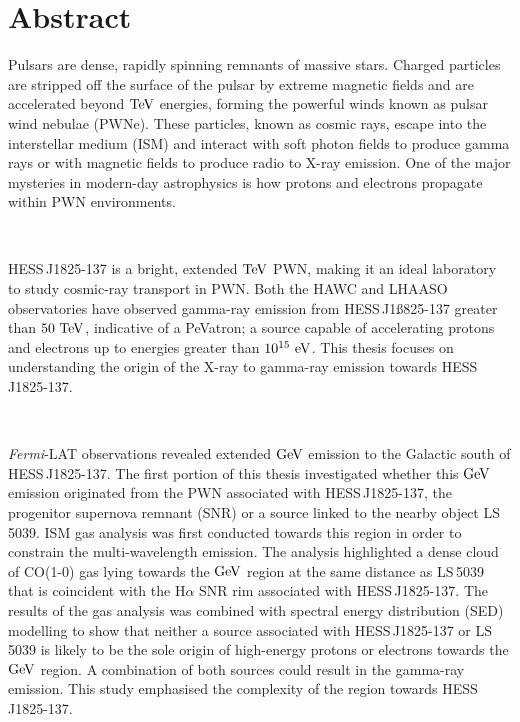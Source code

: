 \chapter{Abstract}
Pulsars are dense, rapidly spinning remnants of massive stars. Charged particles are stripped off the surface of the pulsar by extreme magnetic fields and are accelerated beyond $\TeV$ energies, forming the powerful winds known as pulsar wind nebulae (PWNe). These particles, known as cosmic rays, escape into the interstellar medium (ISM) and interact with soft photon fields to produce gamma rays or with magnetic fields to produce radio to X-ray emission. One of the major mysteries in modern-day astrophysics is how protons and electrons propagate within PWN environments.
\par~\par
\mbox{HESS\,J1825-137} is a bright, extended $\TeV$ PWN, making it an ideal laboratory to study cosmic-ray transport in PWN. Both the HAWC and LHAASO observatories have observed gamma-ray emission from \mbox{HESS\,J1ß825-137} greater than $50~\TeV$, indicative of a PeVatron; a source capable of accelerating protons and electrons up to energies greater than $10^{15}~\si{\electronvolt}$. This thesis focuses on understanding the origin of the X-ray to gamma-ray emission towards \mbox{HESS\,J1825-137}.
\par~\par
\textit{Fermi}-LAT observations revealed extended $\si{\giga\electronvolt}$ emission to the Galactic south of \mbox{HESS\,J1825-137}. The first portion of this thesis investigated whether this $\si{\giga\electronvolt}$ emission originated from the PWN associated with \mbox{HESS\,J1825-137}, the progenitor supernova remnant (SNR) or a source linked to the nearby object \mbox{LS\,5039}. ISM gas analysis was first conducted towards this region in order to constrain the multi-wavelength emission. The analysis highlighted a dense cloud of CO(1-0) gas lying towards the $\si{\giga\electronvolt}$ region at the same distance as \mbox{LS\,5039} that is coincident with the H$\alpha$ SNR rim associated with \mbox{HESS\,J1825-137}. The results of the gas analysis was combined with spectral energy distribution (SED) modelling to show that neither a source associated with \mbox{HESS\,J1825-137} or \mbox{LS\,5039} is likely to be the sole origin of high-energy protons or electrons towards the $\si{\giga\electronvolt}$ region. A combination of both sources could result in the gamma-ray emission. This study emphasised the complexity of the region towards \mbox{HESS\,J1825-137}.
\par~\par
